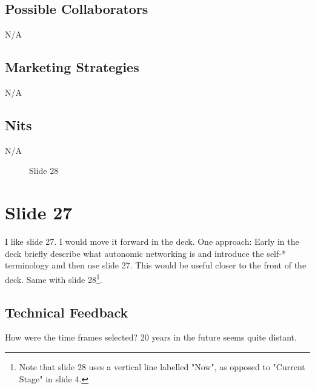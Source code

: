 \documentclass[11pt, oneside]{article}   	%
\begin{document}
\subsection{Possible Collaborators}
\label{slide23:possible_collaborators}
N/A

\subsection{Marketing Strategies}
\label{slide23:marketing_strategies}
N/A

\subsection{Nits}
\label{slide23:nits}
N/A

\begin{figure}
\caption{Slide 28}
\label{fig:slide28}
\end{figure}



\section{Slide 27}
\label{sec:slide27}

I like slide 27. I would move it forward in the deck. One approach:  Early in the deck briefly describe what autonomic networking is and introduce the self-* terminology 
and then use slide 27. This would be useful closer to the front of the deck. Same with slide 28\footnote{Note that slide 28 uses a vertical line labelled "Now", 
as opposed to "Current Stage" in slide 4.}.


\subsection{Technical Feedback}
\label{slide27:technical_feedback}
How were the time frames selected? 20 years in the future seems quite distant.
\end{document}
